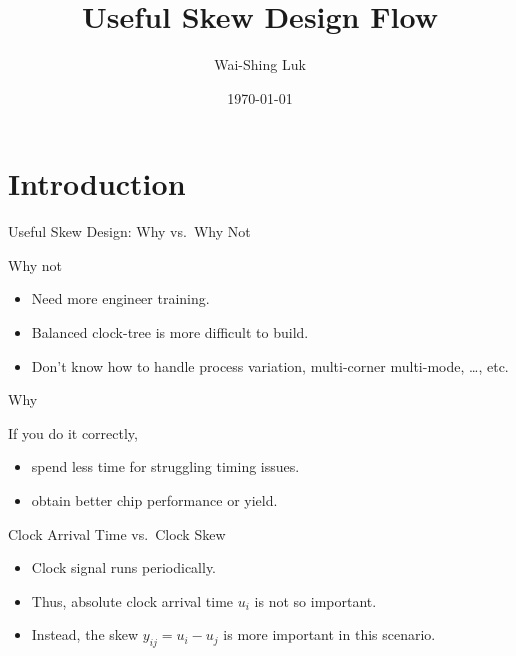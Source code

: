 \documentclass[10pt,ignorenonframetext,mathserif,onlymath]{beamer}
\title{Useful Skew Design Flow}
\author{Wai-Shing Luk}
\institute{Fudan University}
\date{\today}
\providecommand{\tightlist}{%
  \setlength{\itemsep}{0pt}\setlength{\parskip}{0pt}}
\begin{document}
\frame{\titlepage}

\begin{frame}
\tableofcontents[hideallsubsections]
\end{frame}
\hypertarget{introduction}{%
\section{Introduction}\label{introduction}}

\begin{frame}{Useful Skew Design: Why vs.~Why Not}
\protect\hypertarget{sec:first}{}

\begin{block}{Why not}

\begin{itemize}
\tightlist
\item
  Need more engineer training.
\item
  Balanced clock-tree is more difficult to build.
\item
  Don’t know how to handle process variation, multi-corner multi-mode,
  \ldots{}, etc.
\end{itemize}

\end{block}

\begin{block}{Why}

If you do it correctly,

\begin{itemize}
\tightlist
\item
  spend less time for struggling timing issues.
\item
  obtain better chip performance or yield.
\end{itemize}

\end{block}

\end{frame}

\begin{frame}{Clock Arrival Time vs.~Clock Skew}
\protect\hypertarget{clock-arrival-time-vs.clock-skew}{}

\begin{itemize}
\item
  Clock signal runs periodically.
\item
  Thus, absolute clock arrival time \(u_i\) is not so important.
\item
  Instead, the skew \(y_{ij} = u_i - u_j\) is more important in this
  scenario.
\end{itemize}

\end{frame}
\end{document}
